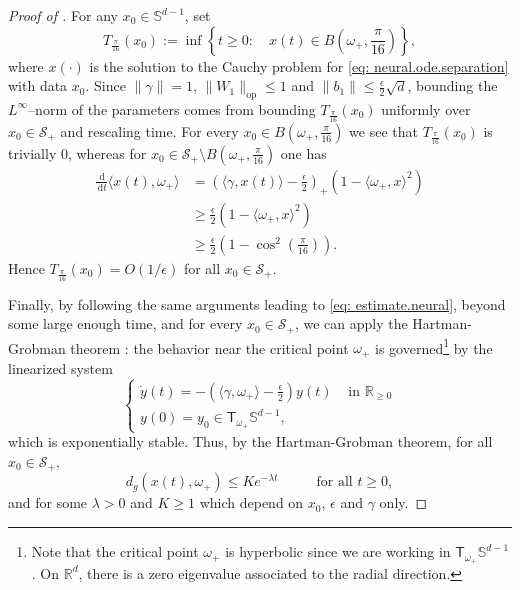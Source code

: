 \documentclass[a4paper,11pt]{article}
\theoremstyle{plain}
\newcommand{\R}{\mathbb{R}}
\newcommand{\diff}{\, \mathrm{d}}
\renewcommand{\S}{\mathbb{S}^{d-1}}
\newcommand{\bW}{\bm{\mathit{W}}}
\renewcommand{\leq}{\leqslant}
\renewcommand{\geq}{\geqslant}
\numberwithin{equation}{section}
\begin{document}
\begin{proof}[Proof of ]
For any $x_0\in\S$, set
\begin{equation*}
T_{\frac{\pi}{16}}(x_0):=\inf\left\{t\geq 0:\quad x(t)\in B\left(\omega_+,\frac{\pi}{16}\right)\right\},
\end{equation*}
where $x(\cdot)$ is the solution to the Cauchy problem for \eqref{eq: neural.ode.separation} with data $x_0$. 
Since $\|\gamma\|=1$, $\|\bW_1\|_{\text{op}}\leq1$ and $\|b_1\|\leq\frac{\epsilon}{2}\sqrt{d}$, bounding the $L^\infty$--norm of the parameters comes from bounding $T_{\frac{\pi}{16}}(x_0)$ uniformly over $x_0\in\mathscr{S}_+$ and rescaling time. 
For every $x_0\in B\left(\omega_+,\frac{\pi}{16}\right)$ we see that $T_{\frac{\pi}{16}}(x_0)$ is trivially $0$, whereas for  $x_0\in \mathscr{S}_+\setminus B\left(\omega_+,\frac{\pi}{16}\right)$ one has
\begin{align} \label{eq: estimate.neural}
\frac{\diff}{\diff t} \langle x(t),\omega_+\rangle&=\left( \langle \gamma, x(t)\rangle-\frac{\epsilon}{2}\right)_+\left(1-\langle \omega_+,x\rangle^2\right)\nonumber\\
&\geq \frac{\epsilon}{2}\left(1-\langle \omega_+,x\rangle^2\right)\nonumber\\
&\geq \frac{\epsilon}{2}\left(1-\cos^2\left(\frac{\pi}{16}\right)\right).
\end{align}
Hence $T_{\frac{\pi}{16}}(x_0)=O(1/\epsilon)$ for all $x_0\in \mathscr{S}_+$.  

Finally, by following the same arguments leading to \eqref{eq: estimate.neural}, beyond some large enough time, and for every $x_0\in \mathscr{S}_+$, we can apply the Hartman-Grobman theorem \cite{hartman1960lemma, hartman1963local, shub2013global}: the behavior near the critical point $\omega_+$ is governed\footnote{Note that the critical point $\omega_+$ is hyperbolic since we are working in $\mathsf{T}_{\omega_+}\S$. On $\mathbb{R}^d$, there is a zero eigenvalue associated to the radial direction.} by the linearized system 
 \begin{equation*}
 \begin{cases}
     \dot{y}(t)=-\left(\langle \gamma,\omega_+\rangle-\displaystyle\frac{\epsilon}{2}\right)y(t) & \text{ in } \R_{\geq0}\\
     y(0)=y_0\in \mathsf{T}_{\omega_+}\S,
     \end{cases}
 \end{equation*}
 which is exponentially stable. Thus, by the Hartman-Grobman theorem, for all $x_0\in\mathscr{S}_+$,
 \begin{equation}\label{eq: Hartman.Grobman}
     d_g(x(t),\omega_+)\leq Ke^{-\lambda t} \hspace{1cm} \text{  for all } t\geq 0, 
 \end{equation}
and for some $\lambda>0$ and $K\geq 1$ which depend on $x_0$, $\epsilon$ and $\gamma$ only.


\end{proof}
\end{document}
